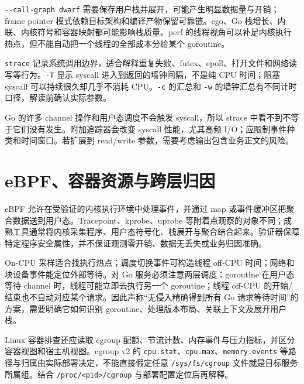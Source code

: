\documentclass[UTF8,fontset=fandol,openany,11pt]{ctexbook}
\begin{document}
\texttt{-\allowbreak{}-\allowbreak{}call-\allowbreak{}graph dwarf} 需要保存用户栈并展开，可能产生明显数据量与开销；frame pointer 模式依赖目标架构和编译产物保留可靠链。cgo、Go 栈增长、内联、内核符号和容器映射都可能影响栈质量。perf 的线程视角可以补足内核执行热点，但不能自动把一个线程的全部成本分给某个 goroutine。\cite{tools-perf}

\texttt{strace} 记录系统调用边界，适合解释重复失败、futex、epoll、打开文件和网络读写等行为。\texttt{-\allowbreak{}T} 显示 syscall 进入到返回的墙钟间隔，不是纯 CPU 时间；阻塞 syscall 可以持续很久却几乎不消耗 CPU。\texttt{-\allowbreak{}c} 的汇总和 \texttt{-\allowbreak{}w} 的墙钟汇总有不同计时口径，解读前确认实际参数。\cite{tools-strace}


Go 的许多 channel 操作和用户态调度不会触发 syscall，所以 strace 中看不到不等于它们没有发生。附加追踪器会改变 syscall 性能，尤其高频 I/O；应限制事件种类和时间窗口。若扩展到 read/write 参数，需要考虑输出包含业务正文的风险。

\section{eBPF、容器资源与跨层归因}
eBPF 允许在受验证的内核执行环境中处理事件，并通过 map 或事件缓冲区把聚合数据送到用户态。Tracepoint、kprobe、uprobe 等附着点观察的对象不同；成熟工具通常将内核采集程序、用户态符号化、栈展开与聚合结合起来。验证器保障特定程序安全属性，并不保证观测零开销、数据无丢失或业务归因准确。\cite{tools-ebpf}

On-CPU 采样适合找执行热点；调度切换事件可构造线程 off-CPU 时间；网络和块设备事件能定位外部等待。对 Go 服务必须注意两层调度：goroutine 在用户态等待 channel 时，线程可能立即去执行另一个 goroutine；线程 off-CPU 的开始/结束也不自动对应某个请求。因此声称“无侵入精确得到所有 Go 请求等待时间”的方案，需要明确它如何识别 goroutine、处理版本布局、关联上下文及展开用户栈。

Linux 容器排查还应读取 cgroup 配额、节流计数、内存事件与压力指标，并区分容器视图和宿主机视图。cgroup v2 的 \texttt{cpu.\allowbreak{}stat}、\texttt{cpu.\allowbreak{}max}、\texttt{memory.\allowbreak{}events} 等路径与归属由实际部署决定，不能直接假定任意 \texttt{/\allowbreak{}sys/\allowbreak{}fs/\allowbreak{}cgroup} 文件就是目标服务所属组。结合 \texttt{/\allowbreak{}proc/\allowbreak{}<pid>/\allowbreak{}cgroup} 与部署配置定位后再解释。
\end{document}
